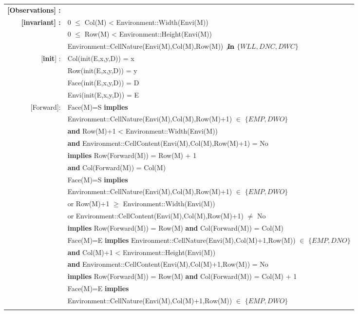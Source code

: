 \begin{tabular}{rl}
\textbf{[Observations] :}\\
\textbf{[invariant] :} & 
0 $\leq$ Col(M) < Environment::Width(Envi(M))\\
&
0 $\leq$ Row(M) < Environment::Height(Envi(M))\\
&
Environment::CellNature(Envi(M),Col(M),Row(M)) $\not\textbf{in}$
$\{WLL, DNC, DWC\}$\\

[\textbf{init}] : & 
Col(init(E,x,y,D)) = x\\
&
Row(init(E,x,y,D)) = y\\&
Face(init(E,x,y,D)) = D\\&
Envi(init(E,x,y,D)) = E\\

[Forward]:&
Face(M)=S \textbf{implies}\\
&
\quad Environment::CellNature(Envi(M),Col(M),Row(M)+1) $\in$ $\{EMP, DWO\}$\\
&
\quad \textbf{and} Row(M)+1 < Environment::Width(Envi(M))\\
&
\quad \textbf{and} Environment::CellContent(Envi(M),Col(M),Row(M)+1) = No
\\&
\quad\quad \textbf{implies} Row(Forward(M)) = Row(M) + 1\\
&
\quad\textbf{and} Col(Forward(M)) = Col(M) \\
&
Face(M)=S \textbf{implies}\\ &
\quad Environment::CellNature(Envi(M),Col(M),Row(M)+1) $\in$  $\{EMP, DWO\}$ \\&
\quad  or Row(M)+1 $\geq$ Environment::Width(Envi(M))\\&
\quad or Environment::CellContent(Envi(M),Col(M),Row(M)+1) $\neq$ No\\&
\quad \textbf{implies} Row(Forward(M)) = Row(M) \textbf{and} Col(Forward(M)) = Col(M)\\
&
Face(M)=E \textbf{implies} 
Environment::CellNature(Envi(M),Col(M)+1,Row(M)) $\in$ $\{EMP, DNO\}$\\&
\quad\textbf{and} Col(M)+1 < Environment::Height(Envi(M))\\
&
\textbf{and} Environment::CellContent(Envi(M),Col(M)+1,Row(M)) = No
\\&
\textbf{implies} Row(Forward(M)) = Row(M) \textbf{and} Col(Forward(M)) = Col(M) + 1\\
&
Face(M)=E \textbf{implies} \\&
\quad Environment::CellNature(Envi(M),Col(M)+1,Row(M)) $\in$ $\{EMP, DWO\}$\\&

\end{tabular}
